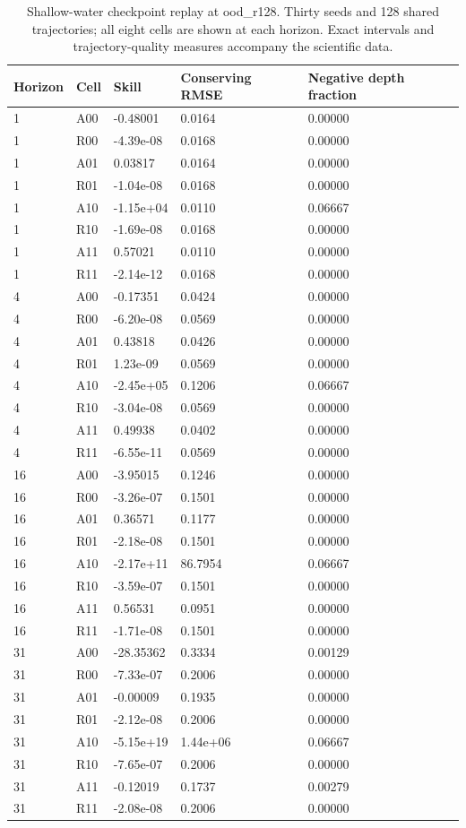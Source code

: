 \begin{table}[H]
\centering
\small
\setlength{\tabcolsep}{3pt}
\begin{tabular}{lllll}
\toprule
Horizon & Cell & Skill & Conserving RMSE & Negative depth fraction \\\midrule
1 & A00 & -0.48001 & 0.0164 & 0.00000 \\
1 & R00 & -4.39e-08 & 0.0168 & 0.00000 \\
1 & A01 & 0.03817 & 0.0164 & 0.00000 \\
1 & R01 & -1.04e-08 & 0.0168 & 0.00000 \\
1 & A10 & -1.15e+04 & 0.0110 & 0.06667 \\
1 & R10 & -1.69e-08 & 0.0168 & 0.00000 \\
1 & A11 & 0.57021 & 0.0110 & 0.00000 \\
1 & R11 & -2.14e-12 & 0.0168 & 0.00000 \\
4 & A00 & -0.17351 & 0.0424 & 0.00000 \\
4 & R00 & -6.20e-08 & 0.0569 & 0.00000 \\
4 & A01 & 0.43818 & 0.0426 & 0.00000 \\
4 & R01 & 1.23e-09 & 0.0569 & 0.00000 \\
4 & A10 & -2.45e+05 & 0.1206 & 0.06667 \\
4 & R10 & -3.04e-08 & 0.0569 & 0.00000 \\
4 & A11 & 0.49938 & 0.0402 & 0.00000 \\
4 & R11 & -6.55e-11 & 0.0569 & 0.00000 \\
16 & A00 & -3.95015 & 0.1246 & 0.00000 \\
16 & R00 & -3.26e-07 & 0.1501 & 0.00000 \\
16 & A01 & 0.36571 & 0.1177 & 0.00000 \\
16 & R01 & -2.18e-08 & 0.1501 & 0.00000 \\
16 & A10 & -2.17e+11 & 86.7954 & 0.06667 \\
16 & R10 & -3.59e-07 & 0.1501 & 0.00000 \\
16 & A11 & 0.56531 & 0.0951 & 0.00000 \\
16 & R11 & -1.71e-08 & 0.1501 & 0.00000 \\
31 & A00 & -28.35362 & 0.3334 & 0.00129 \\
31 & R00 & -7.33e-07 & 0.2006 & 0.00000 \\
31 & A01 & -0.00009 & 0.1935 & 0.00000 \\
31 & R01 & -2.12e-08 & 0.2006 & 0.00000 \\
31 & A10 & -5.15e+19 & 1.44e+06 & 0.06667 \\
31 & R10 & -7.65e-07 & 0.2006 & 0.00000 \\
31 & A11 & -0.12019 & 0.1737 & 0.00279 \\
31 & R11 & -2.08e-08 & 0.2006 & 0.00000 \\
\bottomrule
\end{tabular}
\caption{Shallow-water checkpoint replay at ood\_r128. Thirty seeds and 128 shared trajectories; all eight cells are shown at each horizon. Exact intervals and trajectory-quality measures accompany the scientific data.}
\label{tab:swe-skill-ood_r128}
\end{table}
